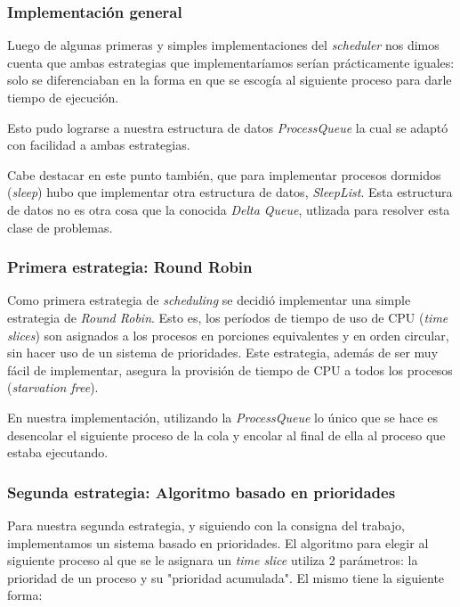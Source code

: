\documentclass[a4paper,10pt]{article}
\begin{document}
        \subsubsection{Implementación general}
	Luego de algunas primeras y simples implementaciones del \textit{scheduler} nos dimos cuenta que ambas estrategias que 
	implementaríamos serían prácticamente iguales: solo se diferenciaban en la forma en que se escogía al siguiente proceso
	para darle tiempo de ejecución. 

	Esto pudo lograrse a nuestra estructura de datos \textit{ProcessQueue} la cual se adaptó con facilidad a ambas estrategias.

	Cabe destacar en este punto también, que para implementar procesos dormidos (\textit{sleep}) hubo que implementar otra estructura
	de datos, \textit{SleepList}. Esta estructura de datos no es otra cosa que la conocida \textit{Delta Queue}, utlizada para resolver 
	esta clase de problemas.

        \subsubsection{Primera estrategia: Round Robin}
        Como primera estrategia de \textit{scheduling} se decidió implementar una simple estrategia de \textit{Round Robin}.
        Esto es, los períodos de tiempo de uso de CPU (\textit{time slices}) son asignados a los procesos en porciones 
        equivalentes y en orden circular, sin hacer uso de un sistema de prioridades. Este estrategia, además de ser muy 
        fácil de implementar, asegura la provisión de tiempo de CPU a todos los procesos (\textit{starvation free}).

	En nuestra implementación, utilizando la \textit{ProcessQueue} lo único que se hace es desencolar el siguiente proceso 
	de la cola y encolar al final de ella al proceso que estaba ejecutando.

        \subsubsection{Segunda estrategia: Algoritmo basado en prioridades}
        Para nuestra segunda estrategia, y siguiendo con la consigna del trabajo, implementamos un sistema basado en 
        prioridades. El algoritmo para elegir al siguiente proceso al que se le asignara un \textit{time slice} utiliza
        2 parámetros: la prioridad de un proceso y su "prioridad acumulada". El mismo tiene la siguiente forma:
\end{document}
